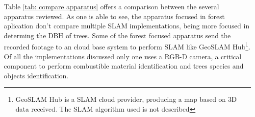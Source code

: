 Table \ref*{tab: compare apparatus} offers a comparison between the several apparatus reviewed. As one is able to see, the apparatus focused in forest aplication don't compare multiple \acs*{SLAM} implementations, being more focused in determing the \acs*{DBH} of trees. Some of the forest focused apparatus send the recorded footage to an cloud base system to perform \acs*{SLAM} like GeoSLAM Hub\footnote{GeoSLAM Hub is a \acs*{SLAM} cloud provider, producing a map based on 3D data received. The \acs*{SLAM} algorithm used is not described}. Of all the implementations discussed only one uses a RGB-D camera, a critical component to perform combustible material identification and trees species and objects identification.

\begin{table}[H]
  \centering
\end{table}
